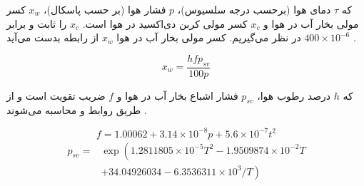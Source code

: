 که $\tau$ دمای هوا (برحسب درجه سلسیوس)، $p$ فشار هوا (بر حسب پاسکال)، $x_w$ کسر مولی بخار آب در هوا و $x_c$ کسر مولی کربن دی‌اکسید در هوا است. $x_c$ را ثابت و برابر $400 \times 10^{-6}$ در نظر می‌گیریم. کسر مولی بخار آب در هوا $x_w$ از رابطه  بدست می‌آید . 

\begin{equation}\label{eq:x_w}
	x_w=\frac{h f p_{sv}}{100 p}
\end{equation}

که $h$ درصد رطوب هوا، $p_{sv}$ فشار اشباع بخار آب در هوا و $f$ ضریب تقویت است و از طریق روابط 
 و  محاسبه می‌شوند .

\begin{equation}\label{eq:f}
	f=1.00062+3.14 \times 10^{-8} p+5.6 \times 10^{-7} t^{2}
\end{equation}
\begin{equation}\label{eq:p_sv}
	\begin{aligned}
		p_{s v}=& \exp \left(1.2811805 \times 10^{-5} T^{2}-1.9509874 \times 10^{-2} T\right.\\
		&\left.+34.04926034-6.3536311 \times 10^{3} / T\right)
	\end{aligned}
\end{equation}


